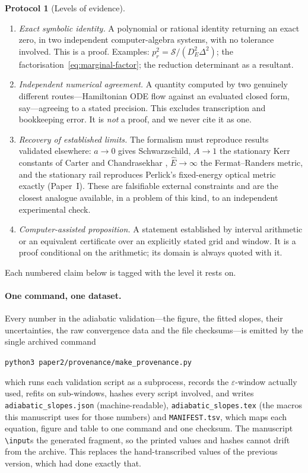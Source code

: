 \documentclass[12pt]{iopart}
\theoremstyle{plain}
\theoremstyle{definition}
\newtheorem{protocol}{Protocol}
\theoremstyle{remark}
\newcommand{\Ehat}{\hat E}
\begin{document}
\begin{protocol}[Levels of evidence]
\label{prot:evidence}
\begin{enumerate}
\item[\rm(I)] \emph{Exact symbolic identity.} A polynomial or rational identity
returning an exact zero, in two independent computer-algebra systems, with no
tolerance involved. This is a proof. Examples: $p_r^2=\mathcal S/(D_E^2\Delta^2)$;
the factorisation~\eqref{eq:marginal-factor}; the reduction determinant as a
resultant.
\item[\rm(II)] \emph{Independent numerical agreement.} A quantity computed by
two genuinely different routes---Hamiltonian ODE flow against an evaluated
closed form, say---agreeing to a stated precision. This excludes transcription
and bookkeeping error. It is \emph{not} a proof, and we never cite it as one.
\item[\rm(III)] \emph{Recovery of established limits.} The formalism must
reproduce results validated elsewhere: $a\to0$ gives Schwarzschild, $A\to1$ the
stationary Kerr constants of Carter and Chandrasekhar
\cite{Carter1968,Chandrasekhar}, $\Ehat\to\infty$ the Fermat--Randers metric,
and the stationary rail reproduces Perlick's fixed-energy optical metric
\cite{Perlick1991} exactly (Paper~I). These are falsifiable external constraints
and are the closest analogue available, in a problem of this kind, to an
independent experimental check.
\item[\rm(IV)] \emph{Computer-assisted proposition.} A statement established by
interval arithmetic or an equivalent certificate over an explicitly stated grid
and window. It is a proof conditional on the arithmetic; its domain is always
quoted with it.
\end{enumerate}
Each numbered claim below is tagged with the level it rests on.
\end{protocol}

\paragraph{One command, one dataset.} Every number in the adiabatic validation---the
figure, the fitted slopes, their uncertainties, the raw convergence data and the file
checksums---is emitted by the single archived command
\begin{center}
\texttt{python3 paper2/provenance/make\_provenance.py}
\end{center}
which runs each validation script as a subprocess, records the $\varepsilon$-window
actually used, refits on sub-windows, hashes every script involved, and writes
\texttt{adiabatic\_slopes.json} (machine-readable), \texttt{adiabatic\_slopes.tex} (the
macros this manuscript uses for those numbers) and \texttt{MANIFEST.tsv}, which maps each
equation, figure and table to one command and one checksum. The manuscript
\texttt{\textbackslash input}s the generated fragment, so the printed values and hashes
cannot drift from the archive. This replaces the hand-transcribed values of the previous
version, which had done exactly that.
\end{document}
